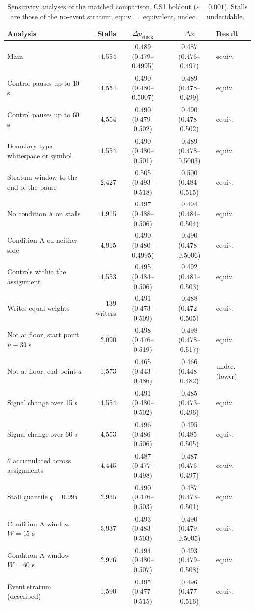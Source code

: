 \begin{table}
  \caption{Sensitivity analyses of the matched comparison, CS1 holdout ($\varepsilon = 0.001$). Stalls are those of
  the no-event stratum; equiv. = equivalent, undec. = undecidable.}
  \label{tab:sens}
  \centering\footnotesize
  \setlength{\tabcolsep}{3pt}
  \begin{tabularx}{\linewidth}{>{\raggedright\arraybackslash}X r c c l}
    \toprule
    Analysis & Stalls & $\Delta p_{\mathrm{stuck}}$ & $\Delta x$ & Result \\
    \midrule
    Main & 4,554 & 0.489 (0.479--0.4995) & 0.487 (0.476--0.497) & equiv. \\
    Control pauses up to 10 s & 4,554 & 0.490 (0.480--0.5007) & 0.489 (0.478--0.499) & equiv. \\
    Control pauses up to 60 s & 4,554 & 0.490 (0.479--0.502) & 0.490 (0.478--0.502) & equiv. \\
    Boundary type: whitespace or symbol & 4,554 & 0.490 (0.480--0.501) & 0.489 (0.478--0.5003) & equiv. \\
    Stratum window to the end of the pause & 2,427 & 0.505 (0.493--0.518) & 0.500 (0.484--0.515) & equiv. \\
    No condition A on stalls & 4,915 & 0.497 (0.488--0.506) & 0.494 (0.484--0.504) & equiv. \\
    Condition A on neither side & 4,915 & 0.490 (0.480--0.4995) & 0.490 (0.478--0.5006) & equiv. \\
    Controls within the assignment & 4,553 & 0.495 (0.484--0.506) & 0.492 (0.481--0.503) & equiv. \\
    Writer-equal weights & 139 writers & 0.491 (0.473--0.509) & 0.488 (0.472--0.505) & equiv. \\
    Not at floor, start point $u - 30$ s & 2,090 & 0.498 (0.476--0.519) & 0.498 (0.478--0.517) & equiv. \\
    Not at floor, end point $u$ & 1,573 & 0.465 (0.443--0.486) & 0.466 (0.448--0.482) & undec. (lower) \\
    Signal change over 15 s & 4,554 & 0.491 (0.480--0.502) & 0.485 (0.473--0.496) & equiv. \\
    Signal change over 60 s & 4,553 & 0.496 (0.486--0.506) & 0.495 (0.485--0.505) & equiv. \\
    $\theta$ accumulated across assignments & 4,445 & 0.487 (0.477--0.498) & 0.487 (0.476--0.497) & equiv. \\
    Stall quantile $q = 0.995$ & 2,935 & 0.490 (0.476--0.503) & 0.487 (0.473--0.501) & equiv. \\
    Condition A window $W = 15$ s & 5,937 & 0.493 (0.483--0.503) & 0.490 (0.479--0.5005) & equiv. \\
    Condition A window $W = 60$ s & 2,976 & 0.494 (0.480--0.507) & 0.493 (0.479--0.508) & equiv. \\
    Event stratum (described) & 1,590 & 0.495 (0.477--0.515) & 0.496 (0.477--0.516) & equiv. \\
    \bottomrule
  \end{tabularx}
\end{table}

